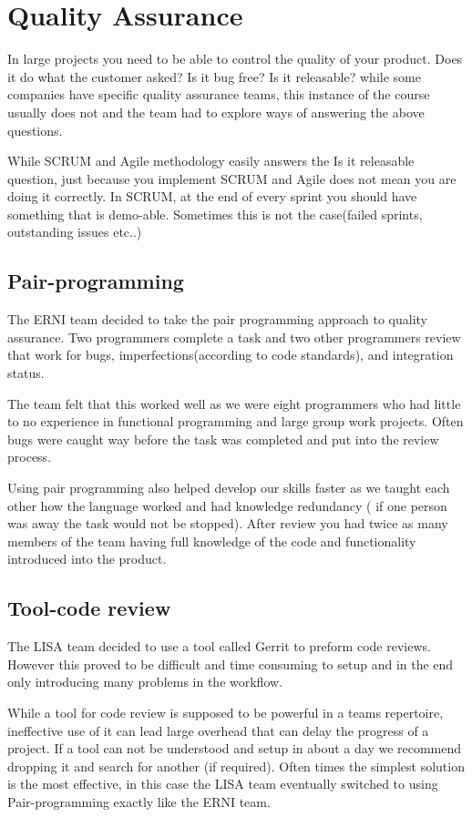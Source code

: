 \section {Quality Assurance}

In large projects you need to be able to control the quality of your product. Does it do what the customer asked? Is it bug free? Is it releasable? while some companies have specific quality assurance teams, this instance of the course usually does not and the team had to explore ways of answering the above questions.

While SCRUM and Agile methodology easily answers the Is it releasable question, just because you implement SCRUM and Agile does not mean you are doing it correctly. In SCRUM, at the end of every sprint you should have something that is demo-able. Sometimes this is not the case(failed sprints, outstanding issues etc..)

\subsection{Pair-programming}

The ERNI team decided to take the pair programming approach to quality assurance. Two programmers complete a task and two other programmers review that work for bugs, imperfections(according to code standards), and integration status. 

The team felt that this worked well as we were eight programmers who had little to no experience in functional programming and large group work projects. Often bugs were caught way before the task was completed and put into the review process. 

Using pair programming also helped develop our skills faster as we taught each other how the language worked and had knowledge redundancy ( if one person was away the task would not be stopped). After review you had twice as many members of the team having full knowledge of the code and functionality introduced into the product.

\subsection{Tool-code review}

The LISA team decided to use a tool called Gerrit to preform code reviews. However this proved to be difficult and time consuming to setup and in the end only introducing many problems in the workflow. 

While a tool for code review is supposed to be powerful in a teams repertoire, ineffective use of it can lead 
large overhead that can delay the progress of a project. If a tool can not be understood and setup in about a day we recommend dropping it and search for another (if required). Often times the simplest solution is the most effective, in this case the LISA team eventually switched to using Pair-programming exactly like the ERNI team.


